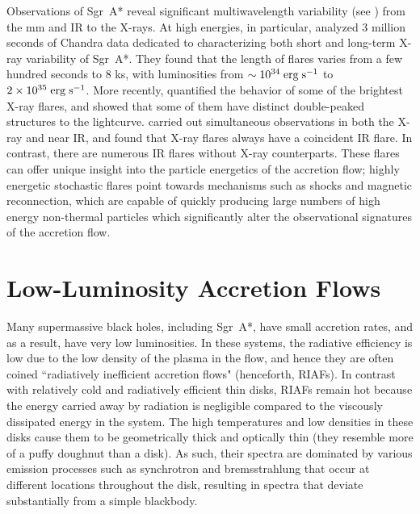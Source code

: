 Observations of Sgr~A* reveal significant multiwavelength variability (see \citealt{eckart2004, marrone2008, neilsen2013, witzel2013, ponti2015, li2015, wang2016}) from the mm and IR to the X-rays.  At high energies, in particular, \citet{neilsen2013} analyzed 3 million seconds of Chandra data dedicated to characterizing both short and long-term X-ray variability of Sgr~A*.  They found that the length of flares varies from a few hundred seconds to 8 ks, with luminosities from $\sim 10^{34} \; \rm{erg} \; \rm{s}^{-1}$ to $2 \times 10^{35} \; \rm{erg} \;  \rm{s}^{-1}$.  More recently, \citet{haggard2019} quantified the behavior of some of the brightest X-ray flares, and showed that some of them have distinct double-peaked structures to the lightcurve.  \citet{eckart2004} carried out simultaneous observations in both the X-ray and near IR, and found that X-ray flares always have a coincident IR flare.  In contrast, there are numerous IR flares without X-ray counterparts.  These flares can offer unique insight into the particle energetics of the accretion flow; highly energetic stochastic flares point towards mechanisms such as shocks and magnetic reconnection, which are capable of quickly producing large numbers of high energy non-thermal particles which significantly alter the observational signatures of the accretion flow.

\section{Low-Luminosity Accretion Flows}
Many supermassive black holes, including Sgr~A*, have small accretion rates, and as a result, have very low luminosities.  In these systems, the radiative efficiency is low due to the low density of the plasma in the flow, and hence they are often coined ``radiatively inefficient accretion flows" (henceforth, RIAFs).  In contrast with relatively cold and radiatively efficient thin disks, RIAFs remain hot because the energy carried away by radiation is negligible compared to the viscously dissipated energy in the system.  The high temperatures and low densities in these disks cause them to be geometrically thick and optically thin (they resemble more of a puffy doughnut than a disk).  As such, their spectra are dominated by various emission processes such as synchrotron and bremsstrahlung that occur at different locations throughout the disk, resulting in spectra that deviate substantially from a simple blackbody.

